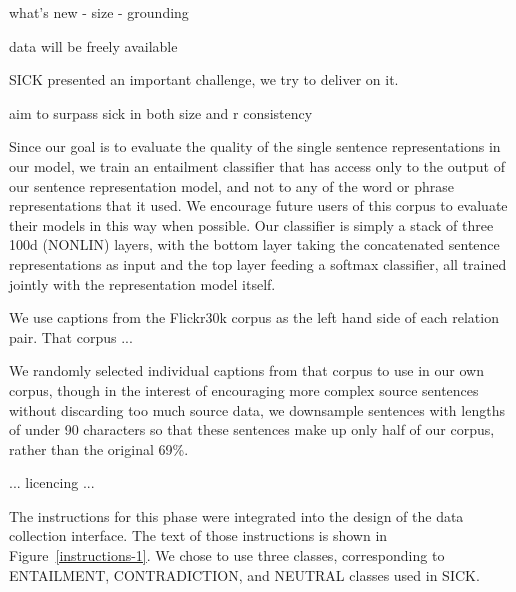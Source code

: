what's new
- size
- grounding

data will be freely available

SICK presented an important challenge, we try to deliver on it.

aim to surpass sick in both size and r consistency

Since our goal is to evaluate the quality of the single sentence representations in our model, we train an entailment classifier that has access only to the output of our sentence representation model, and not to any of the word or phrase representations that it used. We encourage future users of this corpus to evaluate their models in this way when possible. Our classifier is simply a stack of three 100d (NONLIN) layers, with the bottom layer taking the concatenated sentence representations as input and the top layer feeding a softmax classifier, all trained jointly with the representation model itself.

We use captions from the Flickr30k corpus \cite{hodoshimage} as the left hand side of each relation pair. That corpus ...

We randomly selected individual captions from that corpus to use in our own corpus, though in the interest of encouraging more complex source sentences without discarding too much source data, we downsample sentences with lengths of under 90 characters so that these sentences make up only half of our corpus, rather than the original 69\%.

... licencing ...

The instructions for this phase were integrated into the design of the data collection interface. The text of those instructions is shown in Figure~\ref{instructions-1}. We chose to use three classes, corresponding to ENTAILMENT, CONTRADICTION, and NEUTRAL classes used in SICK.

